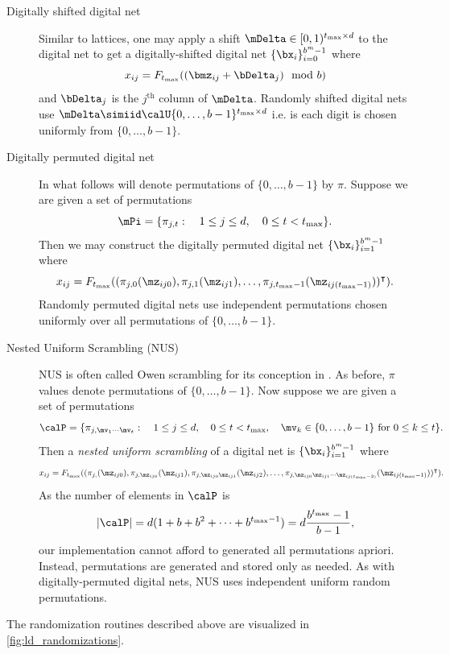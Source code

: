 \documentclass[acmsmall]{acmart}
\begin{document}
\begin{description}
    \item[Digitally shifted digital net] Similar to lattices, one may apply a shift $\mDelta \in [0,1)^{t_\mathrm{max} \times d}$ to the digital net to get a digitally-shifted digital net $\{\bx_i\}_{i=0}^{b^m-1}$ where 
    $$x_{ij} = F_{t_\mathrm{max}}((\bmz_{ij} + \bDelta_j ) \mod b)$$
    and $\bDelta_j$ is the $j^\mathrm{th}$ column of $\mDelta$. Randomly shifted digital nets use $\mDelta \simiid \calU\{0,\dots,b-1\}^{t_\mathrm{max} \times d}$ i.e. is each digit is chosen uniformly from $\{0,\dots,b-1\}$. 
    \item[Digitally permuted digital net] In what follows will denote permutations of $\{0,\dots,b-1\}$ by $\pi$. Suppose we are given a set of permutations
    $$\mPi = \{\pi_{j,t}: \quad 1 \leq j \leq d, \quad 0 \leq t < t_\mathrm{max}\}.$$
    Then we may construct the digitally permuted digital net $\{\bx_i\}_{i=1}^{b^m-1}$ where 
    $$x_{ij} = F_{t_\mathrm{max}}((\pi_{j,0}(\mz_{ij0}),\pi_{j,1}(\mz_{ij1}),\dots,\pi_{j,t_\mathrm{max}-1}(\mz_{ij(t_\mathrm{max}-1)}))^\intercal).$$
    Randomly permuted digital nets use independent permutations chosen uniformly over all permutations of $\{0,\dots,b-1\}$. 
    \item[Nested Uniform Scrambling (NUS)] NUS is often called Owen scrambling for its conception in \citep{owen1995randomly}. As before, $\pi$ values denote permutations of $\{0,\dots,b-1\}$. Now suppose we are given a set of permutations 
    $$\calP = \{\pi_{j,\mv_1\cdots\mv_t}: \quad 1 \leq j \leq d, \quad 0 \leq t < t_\mathrm{max}, \quad \mv_k \in \{0,\dots,b-1\} \text{ for } 0 \leq k \leq t \}.$$
    Then a \emph{nested uniform scrambling} of a digital net is $\{\bx_i\}_{i=1}^{b^m-1}$ where
    $$x_{ij} = F_{t_\mathrm{max}}((\pi_{j,}(\mz_{ij0}),\pi_{j,\mz_{ij0}}(\mz_{ij1}),\pi_{j,\mz_{ij0}\mz_{ij1}}(\mz_{ij2}),\dots,\pi_{j,\mz_{ij0}\mz_{ij1}\cdots\mz_{ij(t_\mathrm{max}-2)}}(\mz_{ij(t_\mathrm{max}-1)}))^\intercal).$$ 
    As the number of elements in $\calP$ is  
    $$\lvert \calP \rvert = d(1+b+b^2+\dots+b^{t_\mathrm{max}-1}) = d \frac{b^{t_\mathrm{max}}-1}{b-1},$$ 
    our implementation cannot afford to generated all permutations apriori. Instead, permutations are generated and stored only as needed. As with digitally-permuted digital nets, NUS uses independent uniform random permutations.  
\end{description}
The randomization routines described above are visualized in \cref{fig:ld_randomizations}. 
\end{document}
